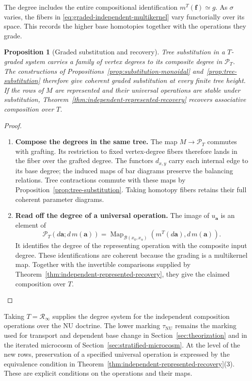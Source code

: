 \documentclass[oneside]{article}
\theoremstyle{plain}
\newtheorem{proposition}[theorem]{Proposition}
\theoremstyle{definition}
\theoremstyle{remark}
\newcommand{\Map}{\operatorname{Map}}
\newcommand{\NU}{\mathrm{NU}}
\newcommand{\RNU}{\mathcal R_{\infty}}
\begin{document}
The degree includes the entire compositional identification
$m^T(\mathbf f)\simeq g$. As $\sigma$ varies, the fibers in
\eqref{eq:graded-independent-multikernel} vary functorially over
its space. This records the higher base homotopies together with
the operations they grade.

\begin{proposition}[Graded substitution and recovery]
\label{prop:graded-independent-recovery}
Tree substitution in a $T$-graded system carries a family of vertex
degrees to its composite degree in $\mathcal P_T$.
The constructions of Propositions~\ref{prop:substitution-monoidal}
and~\ref{prop:tree-substitution} therefore give coherent graded
substitution at every finite tree height.
If the rows of $M$ are represented and their universal operations
are stable under substitution, Theorem~\ref{thm:independent-represented-recovery}
recovers associative composition over $T$.
\end{proposition}
\begin{proof}
\leavevmode
\begin{enumerate}
\item \textbf{Compose the degrees in the same tree.}
The map $M\to\mathcal P_T$ commutes with grafting. Its restriction
to fixed vertex-degree fibers therefore lands in the fiber over
the grafted degree. The functors $d_{x,y}$ carry each internal
edge to its base degree; the induced maps of bar diagrams preserve
the balancing relations. Tree contractions commute with these
maps by Proposition~\ref{prop:tree-substitution}. Taking homotopy
fibers retains their full coherent parameter diagrams.
\item \textbf{Read off the degree of a universal operation.}
The image of $u_{\mathbf a}$ is an element of
\[
 \mathcal P_T(d\mathbf a;d\,m(\mathbf a))
 =
 \Map_{\mathcal B(x_0,x_n)}
       (m^T(d\mathbf a),d\,m(\mathbf a)).
\]
It identifies the degree of the representing operation with the
composite input degree. These identifications are coherent because
the grading is a multikernel map. Together with the invertible
comparisons supplied by
Theorem~\ref{thm:independent-represented-recovery}, they give the
claimed composition over $T$.\qedhere
\end{enumerate}
\end{proof}

Taking $T=\RNU$ supplies the degree system for the independent
composition operations over the NU doctrine. The lower marking
$\tau_{\NU}$ remains the marking used for transport and dependent
base change in Section~\ref{sec:theorization} and in the iterated
microcosm of Section~\ref{sec:stratified-microcosm}.
At the level of the new rows, preservation of a specified universal
operation is expressed by the equivalence condition in
Theorem~\ref{thm:independent-represented-recovery}(3).
These are explicit conditions on the operations and their maps.
\end{document}
